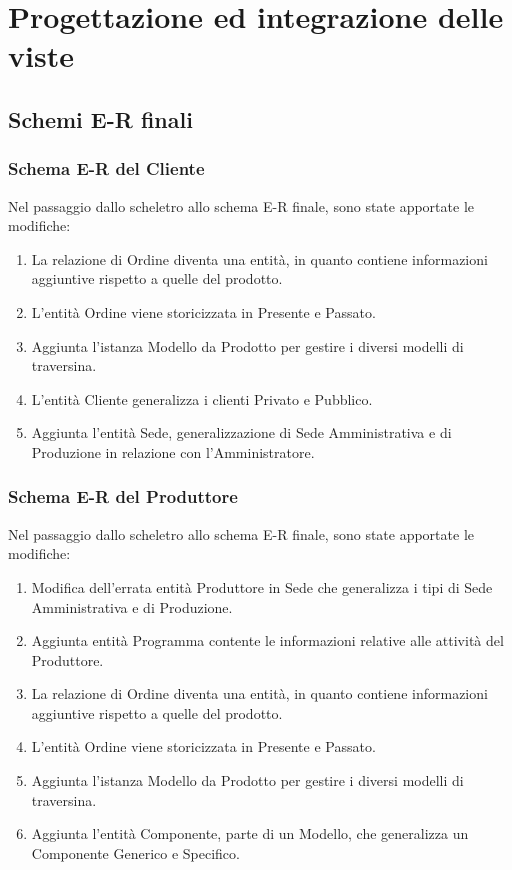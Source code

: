 \documentclass{article}
\begin{document}
\section{Progettazione ed integrazione delle viste}
\subsection{Schemi E-R finali}
\subsubsection{Schema E-R del Cliente}

Nel passaggio dallo scheletro allo schema E-R finale, sono state apportate le modifiche:
\begin{enumerate}
    \item La relazione di Ordine diventa una entità, in quanto contiene informazioni aggiuntive rispetto a quelle del prodotto.
    \item L'entità Ordine viene storicizzata in Presente e Passato.
    \item Aggiunta l'istanza Modello da Prodotto per gestire i diversi modelli di traversina.
    \item L'entità Cliente generalizza i clienti Privato e Pubblico.
    \item Aggiunta l'entità Sede, generalizzazione di Sede Amministrativa e di Produzione in relazione con l'Amministratore.
\end{enumerate}


\subsubsection{Schema E-R del Produttore}
Nel passaggio dallo scheletro allo schema E-R finale, sono state apportate le modifiche:
\begin{enumerate}
    \item Modifica dell'errata entità Produttore in Sede che generalizza i tipi di Sede Amministrativa e di Produzione.
    \item Aggiunta entità Programma contente le informazioni relative alle attività del Produttore.
    \item La relazione di Ordine diventa una entità, in quanto contiene informazioni aggiuntive rispetto a quelle del prodotto.
    \item L'entità Ordine viene storicizzata in Presente e Passato.
    \item Aggiunta l'istanza Modello da Prodotto per gestire i diversi modelli di traversina.
    \item Aggiunta l'entità Componente, parte di un Modello, che generalizza un Componente Generico e Specifico.
\end{enumerate}
\end{document}
